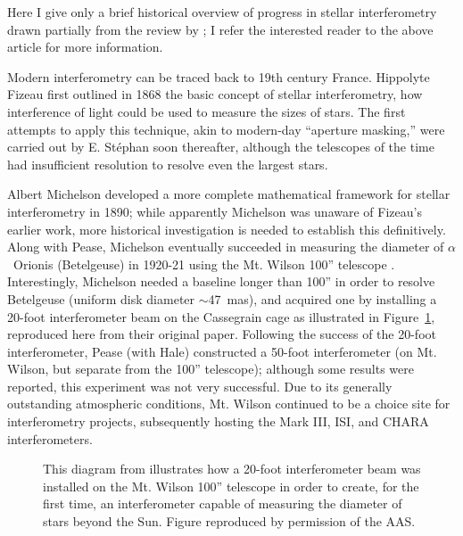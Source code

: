 \documentclass[12pt]{article}
\begin{document}
Here I give only a brief historical overview of progress in stellar
interferometry drawn partially from the review by \citet{lawson2000}; I refer
the interested reader to the above article for more  information.

Modern interferometry can be traced back to 19th century France.
Hippolyte Fizeau first outlined in 1868 the basic concept of stellar 
interferometry, how interference of light could be used to
measure the sizes of stars.  The first attempts to apply this technique,
akin to modern-day ``aperture masking,'' were carried out
by E. St{\' e}phan soon thereafter, although the telescopes of the time had
insufficient resolution to resolve even the largest stars.

Albert Michelson developed a more complete mathematical framework for
stellar interferometry in 1890; while apparently Michelson was unaware
of Fizeau's earlier work, more historical investigation is needed to
establish this definitively.  Along with Pease, Michelson
\citep{michelson1921} eventually succeeded in measuring the diameter
of $\alpha$~Orionis (Betelgeuse) in 1920-21 using the Mt. Wilson 100''
telescope \citep[following earlier measurements of Jupiter's
moons;][]{michelson90,michelson91}.  Interestingly, Michelson needed a
baseline longer than 100'' in order to resolve Betelgeuse (uniform
disk diameter $\sim$47~mas), and acquired one by installing a 20-foot
interferometer beam on the Cassegrain cage as illustrated in
Figure~\ref{monnier_michelson100}, reproduced here from their original
paper.  Following the success of the 20-foot interferometer, Pease
(with Hale) constructed a 50-foot interferometer (on Mt. Wilson, but
separate from the 100'' telescope); although some results were
reported, this experiment was not very successful.  Due to its
generally outstanding atmospheric conditions, Mt. Wilson continued to
be a choice site for interferometry projects, subsequently hosting the Mark III,
ISI, and CHARA interferometers.


\begin{figure}
\begin{center}
\caption{This diagram from \citet[][Figure 1]{michelson1921}
illustrates how a 20-foot interferometer beam was installed on
the Mt. Wilson 100'' telescope in order to create, for the
first time, an
interferometer capable of measuring the
diameter of stars beyond the Sun.  Figure reproduced by permission of the AAS.
\label{monnier_michelson100}}
\end{center}
\end{figure}
\end{document}
